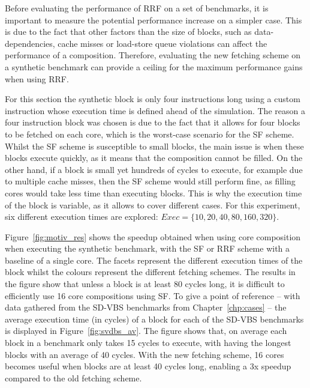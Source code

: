 Before evaluating the performance of RRF on a set of benchmarks, it is important to measure the potential performance increase on a simpler case.
This is due to the fact that other factors than the size of blocks, such as data-dependencies, cache misses or load-store queue violations can affect the performance of a composition.
Therefore, evaluating the new fetching scheme on a synthetic benchmark can provide a ceiling for the maximum performance gains when using RRF.

For this section the synthetic block is only four instructions long using a custom instruction whose execution time is defined ahead of the simulation.
The reason a four instruction block was chosen is due to the fact that it allows for four blocks to be fetched on each core, which is the worst-case scenario for the SF scheme.
Whilst the SF scheme is susceptible to small blocks, the main issue is when these blocks execute quickly, as it means that the composition cannot be filled.
On the other hand, if a block is small yet hundreds of cycles to execute, for example due to multiple cache misses, then the SF scheme would still perform fine, as filling cores would take less time than executing blocks.
This is why the execution time of the block is variable, as it allows to cover different cases.
For this experiment, six different execution times are explored: $Exec=\{10,20,40,80,160,320\}$.

Figure~\ref{fig:motiv_res} shows the speedup obtained when using core composition when executing the synthetic benchmark, with the SF or RRF scheme with a baseline of a single core.
The facets represent the different execution times of the block whilst the colours represent the different fetching schemes.
The results in the figure show that unless a block is at least 80 cycles long, it is difficult to efficiently use 16 core compositions using SF.
To give a point of reference -- with data gathered from the SD-VBS benchmarks from Chapter~\ref{chp:cases} -- the average execution time (in cycles) of a block for each of the SD-VBS benchmarks is displayed in Figure~\ref{fig:svdbs_av}.
The figure shows that, on average each block in a benchmark only takes 15 cycles to execute, with  having the longest blocks with an average of 40 cycles.
With the new fetching scheme, 16 cores becomes useful when blocks are at least 40 cycles long, enabling a 3x speedup compared to the old fetching scheme.
